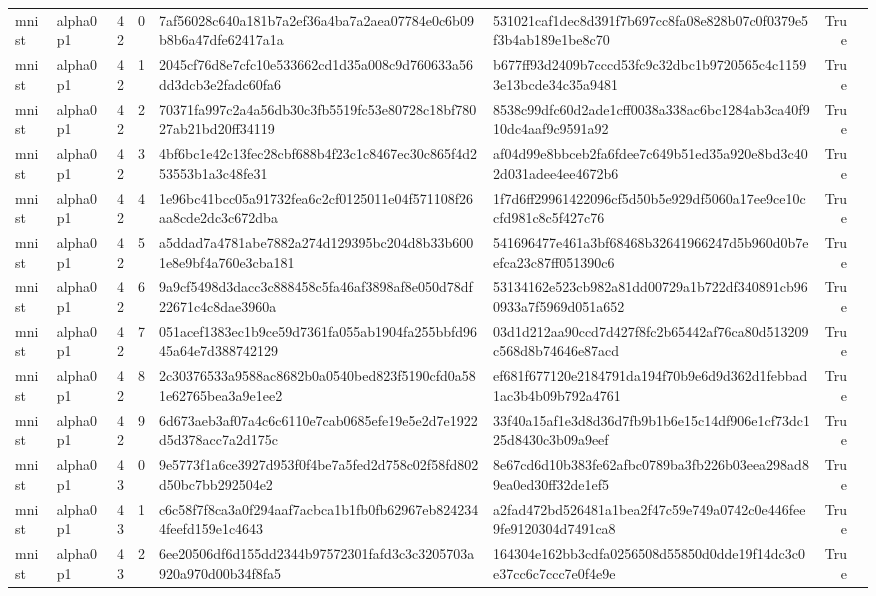 \begin{tabular}{llrrllrl}
mnist & alpha0p1 & 42 & 0 & 7af56028c640a181b7a2ef36a4ba7a2aea07784e0c6b09b8b6a47dfe62417a1a & 531021caf1dec8d391f7b697cc8fa08e828b07c0f0379e5f3b4ab189e1be8c70 & True &  \\
mnist & alpha0p1 & 42 & 1 & 2045cf76d8e7cfc10e533662cd1d35a008c9d760633a56dd3dcb3e2fadc60fa6 & b677ff93d2409b7cccd53fc9c32dbc1b9720565c4c11593e13bcde34c35a9481 & True &  \\
mnist & alpha0p1 & 42 & 2 & 70371fa997c2a4a56db30c3fb5519fc53e80728c18bf78027ab21bd20ff34119 & 8538c99dfc60d2ade1cff0038a338ac6bc1284ab3ca40f910dc4aaf9c9591a92 & True &  \\
mnist & alpha0p1 & 42 & 3 & 4bf6bc1e42c13fec28cbf688b4f23c1c8467ec30c865f4d253553b1a3c48fe31 & af04d99e8bbceb2fa6fdee7c649b51ed35a920e8bd3c402d031adee4ee4672b6 & True &  \\
mnist & alpha0p1 & 42 & 4 & 1e96bc41bcc05a91732fea6c2cf0125011e04f571108f26aa8cde2dc3c672dba & 1f7d6ff29961422096cf5d50b5e929df5060a17ee9ce10ccfd981c8c5f427c76 & True &  \\
mnist & alpha0p1 & 42 & 5 & a5ddad7a4781abe7882a274d129395bc204d8b33b6001e8e9bf4a760e3cba181 & 541696477e461a3bf68468b32641966247d5b960d0b7eefca23c87ff051390c6 & True &  \\
mnist & alpha0p1 & 42 & 6 & 9a9cf5498d3dacc3c888458c5fa46af3898af8e050d78df22671c4c8dae3960a & 53134162e523cb982a81dd00729a1b722df340891cb960933a7f5969d051a652 & True &  \\
mnist & alpha0p1 & 42 & 7 & 051acef1383ec1b9ce59d7361fa055ab1904fa255bbfd9645a64e7d388742129 & 03d1d212aa90ccd7d427f8fc2b65442af76ca80d513209c568d8b74646e87acd & True &  \\
mnist & alpha0p1 & 42 & 8 & 2c30376533a9588ac8682b0a0540bed823f5190cfd0a581e62765bea3a9e1ee2 & ef681f677120e2184791da194f70b9e6d9d362d1febbad1ac3b4b09b792a4761 & True &  \\
mnist & alpha0p1 & 42 & 9 & 6d673aeb3af07a4c6c6110e7cab0685efe19e5e2d7e1922d5d378acc7a2d175c & 33f40a15af1e3d8d36d7fb9b1b6e15c14df906e1cf73dc125d8430c3b09a9eef & True &  \\
mnist & alpha0p1 & 43 & 0 & 9e5773f1a6ce3927d953f0f4be7a5fed2d758c02f58fd802d50bc7bb292504e2 & 8e67cd6d10b383fe62afbc0789ba3fb226b03eea298ad89ea0ed30ff32de1ef5 & True &  \\
mnist & alpha0p1 & 43 & 1 & c6c58f7f8ca3a0f294aaf7acbca1b1fb0fb62967eb8242344feefd159e1c4643 & a2fad472bd526481a1bea2f47c59e749a0742c0e446fee9fe9120304d7491ca8 & True &  \\
mnist & alpha0p1 & 43 & 2 & 6ee20506df6d155dd2344b97572301fafd3c3c3205703a920a970d00b34f8fa5 & 164304e162bb3cdfa0256508d55850d0dde19f14dc3c0e37cc6c7ccc7e0f4e9e & True &  \\

\end{tabular}
